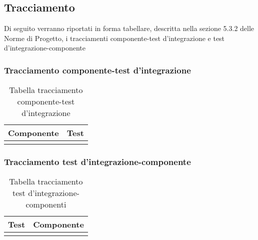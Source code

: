 \subsection{Tracciamento}
Di seguito verranno riportati in forma tabellare, descritta nella sezione 5.3.2 delle Norme di Progetto, i tracciamenti componente-test d'integrazione e test d'integrazione-componente
\subsubsection{Tracciamento componente-test d'integrazione}
\begin{center}
\begin{longtable}{|c|c|}
\toprule
\textbf{Componente} & \textbf{Test}\\
\bottomrule
\caption{Tabella tracciamento componente-test d'integrazione}
\label{tab:changelog}
\end{longtable}
\end{center}
\subsubsection{Tracciamento test d'integrazione-componente}
\begin{center}
\begin{longtable}{|c|c|}
\toprule
\textbf{Test} & \textbf{Componente}\\
\bottomrule
\caption{Tabella tracciamento test d'integrazione-componenti}
\label{tab:changelog}
\end{longtable}
\end{center}

